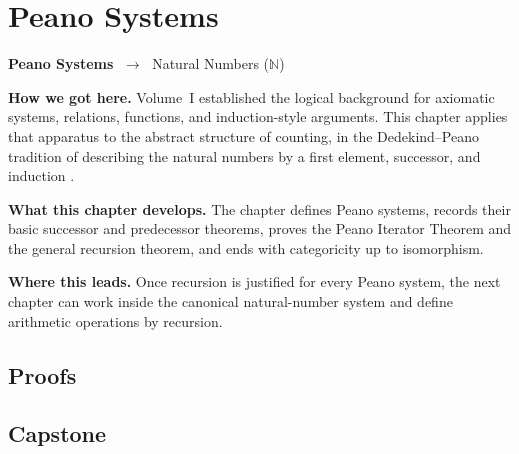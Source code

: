 \chapter{Peano Systems}


\begin{tcolorbox}[
  colback=breadcrumb!8,
  colframe=breadcrumb!50,
  arc=2pt,
  left=8pt, right=8pt, top=6pt, bottom=6pt,
  title={\small\textbf{peano-systems}},
  fonttitle=\small\bfseries
]
\begin{center}
\small
\textbf{Peano Systems}
$\;\to\;$ Natural Numbers ($\mathbb{N}$)
\end{center}
\end{tcolorbox}

\begin{tcolorbox}[
  colback=gray!6,
  colframe=gray!40,
  arc=2pt,
  left=8pt, right=8pt, top=6pt, bottom=6pt,
  title={\small\textbf{Structural Roadmap}},
  fonttitle=\small\bfseries
]
\noindent\textbf{How we got here.}
Volume~I established the logical background for axiomatic systems, relations,
functions, and induction-style arguments. This chapter applies that apparatus
to the abstract structure of counting, in the Dedekind--Peano tradition of
describing the natural numbers by a first element, successor, and induction
\citep{dedekind1901essays,PeanoArithmeticesPrincipia1889}.

\medskip
\noindent\textbf{What this chapter develops.}
The chapter defines Peano systems, records their basic successor and
predecessor theorems, proves the Peano Iterator Theorem and the general
recursion theorem, and ends with categoricity up to isomorphism.

\medskip
\noindent\textbf{Where this leads.}
Once recursion is justified for every Peano system, the next chapter can work
inside the canonical natural-number system and define arithmetic operations by
recursion.
\end{tcolorbox}



\section*{Proofs}


\section*{Capstone}


